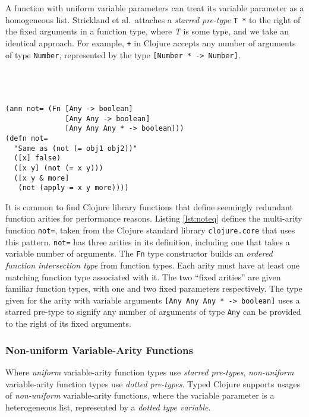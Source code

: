 A function with uniform variable parameters can treat its variable parameter
as a homogeneous list. 
Strickland et al.\ attaches a \emph{starred pre-type} \lstinline|T *| to the right of the fixed arguments
in a function type, where \emph{T} is some type, and we take an identical approach.
For example, \lstinline|+| in Clojure accepts any number of arguments
of type \lstinline|Number|, represented by the type \lstinline|[Number * -> Number]|.
\\\\\\\\

\begin{lstlisting}[caption=Typing multi-arity functions, label=lst:noteq]
(ann not= (Fn [Any -> boolean]
              [Any Any -> boolean]
              [Any Any Any * -> boolean]))
(defn not=
  "Same as (not (= obj1 obj2))"
  ([x] false)
  ([x y] (not (= x y)))
  ([x y & more]
   (not (apply = x y more))))
\end{lstlisting}

It is common to find Clojure library functions that define seemingly redundant
function arities for performance reasons.
Listing \ref{lst:noteq} defines the multi-arity function \lstinline|not=|,
taken from the Clojure standard library \lstinline|clojure.core| that uses this pattern.
\lstinline|not=| has three arities in its definition, including
one that takes a variable number of arguments.
The \lstinline|Fn| type constructor builds an \emph{ordered function intersection type} from
function types. Each arity must have at least one matching function type associated with it.
The two ``fixed arities'' are given familiar function types, with one and two fixed parameters respectively.
The type given for the arity with variable arguments \lstinline|[Any Any Any * -> boolean]|
uses a starred pre-type to signify any number of arguments of type \lstinline|Any|
can be provided to the right of its fixed arguments.

\subsubsection{Non-uniform Variable-Arity Functions}

Where \emph{uniform} variable-arity function types use \emph{starred pre-types}, \emph{non-uniform}
variable-arity function types use \emph{dotted pre-types}.
Typed Clojure supports usages of \emph{non-uniform} variable-arity functions,
where the variable parameter is a heterogeneous list, represented by a \emph{dotted type variable}.


